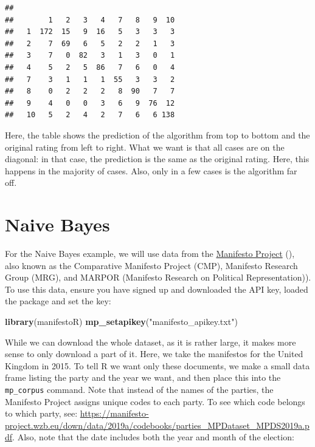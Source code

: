 \documentclass[
]{book}
\newenvironment{Shaded}{\begin{snugshade}}{\end{snugshade}}
\newcommand{\FunctionTok}[1]{\textcolor[rgb]{0.13,0.29,0.53}{\textbf{#1}}}
\newcommand{\NormalTok}[1]{#1}
\newcommand{\StringTok}[1]{\textcolor[rgb]{0.31,0.60,0.02}{#1}}
\begin{document}
\begin{verbatim}
##     
##        1   2   3   4   7   8   9  10
##   1  172  15   9  16   5   3   3   3
##   2    7  69   6   5   2   2   1   3
##   3    7   0  82   3   1   3   0   1
##   4    5   2   5  86   7   6   0   4
##   7    3   1   1   1  55   3   3   2
##   8    0   2   2   2   8  90   7   7
##   9    4   0   0   3   6   9  76  12
##   10   5   2   4   2   7   6   6 138
\end{verbatim}

Here, the table shows the prediction of the algorithm from top to bottom and the original rating from left to right. What we want is that all cases are on the diagonal: in that case, the prediction is the same as the original rating. Here, this happens in the majority of cases. Also, only in a few cases is the algorithm far off.

\section{Naive Bayes}\label{naive-bayes}

For the Naive Bayes example, we will use data from the \href{https://manifestoproject.wzb.eu/}{Manifesto Project} (), also known as the Comparative Manifesto Project (CMP), Manifesto Research Group (MRG), and MARPOR (Manifesto Research on Political Representation)). To use this data, ensure you have signed up and downloaded the API key, loaded the package and set the key:

\begin{Shaded}
\begin{Highlighting}[]
\FunctionTok{library}\NormalTok{(manifestoR)}
\FunctionTok{mp\_setapikey}\NormalTok{(}\StringTok{"manifesto\_apikey.txt"}\NormalTok{)}
\end{Highlighting}
\end{Shaded}

While we can download the whole dataset, as it is rather large, it makes more sense to only download a part of it. Here, we take the manifestos for the United Kingdom in 2015. To tell R we want only these documents, we make a small data frame listing the party and the year we want, and then place this into the \texttt{mp\_corpus} command. Note that instead of the names of the parties, the Manifesto Project assigns unique codes to each party. To see which code belongs to which party, see: \url{https://manifesto-project.wzb.eu/down/data/2019a/codebooks/parties_MPDataset_MPDS2019a.pdf}. Also, note that the date includes both the year and month of the election:
\end{document}
